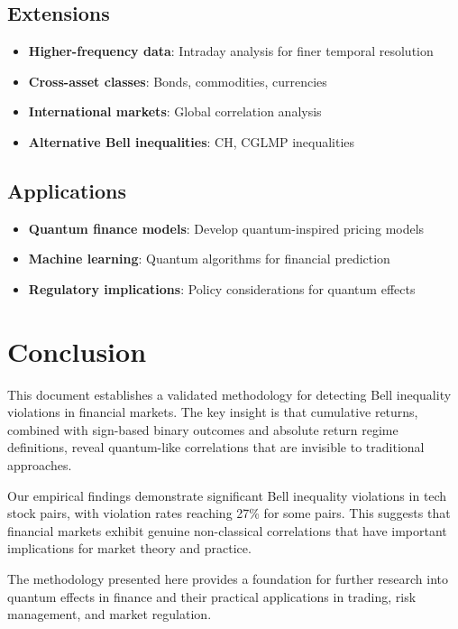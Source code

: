 \documentclass[11pt,a4paper]{article}
\begin{document}
\subsection{Extensions}

\begin{itemize}
    \item \textbf{Higher-frequency data}: Intraday analysis for finer temporal resolution
    \item \textbf{Cross-asset classes}: Bonds, commodities, currencies
    \item \textbf{International markets}: Global correlation analysis
    \item \textbf{Alternative Bell inequalities}: CH, CGLMP inequalities
\end{itemize}

\subsection{Applications}

\begin{itemize}
    \item \textbf{Quantum finance models}: Develop quantum-inspired pricing models
    \item \textbf{Machine learning}: Quantum algorithms for financial prediction
    \item \textbf{Regulatory implications}: Policy considerations for quantum effects
\end{itemize}

\section{Conclusion}

This document establishes a validated methodology for detecting Bell inequality violations in financial markets. The key insight is that cumulative returns, combined with sign-based binary outcomes and absolute return regime definitions, reveal quantum-like correlations that are invisible to traditional approaches.

Our empirical findings demonstrate significant Bell inequality violations in tech stock pairs, with violation rates reaching 27\% for some pairs. This suggests that financial markets exhibit genuine non-classical correlations that have important implications for market theory and practice.

The methodology presented here provides a foundation for further research into quantum effects in finance and their practical applications in trading, risk management, and market regulation.
\end{document}
